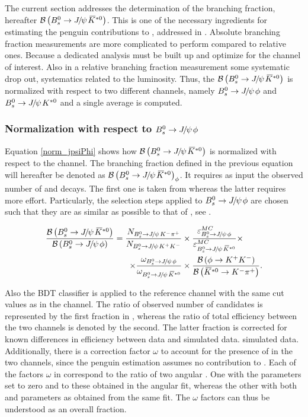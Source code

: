 
The current section addresses the determination of the \BsJpsiKst branching fraction, hereafter $\BRof\BsJpsiKst$.
This is one of the necessary ingredients for estimating the penguin contributions to \phis, addressed in .
Absolute branching fraction measurements are more complicated to perform compared to relative ones. Because a
dedicated analysis must be built up and optimize for the channel of interest. Also in a relative branching fraction
measurement some systematic drop out, \ie systematics related to the luminosity. Thus, the $\BRof\BsJpsiKst$ is
normalized with respect to two different channels, namely $\BsJpsiPhi$ and $\BdJpsiKst$ and a single average is computed.

\subsubsection{Normalization with respect to $\BsJpsiPhi$}
Equation \ref{norm_jpsiPhi} shows how $\BRof\BsJpsiKst$ is normalized with respect to the \BsJpsiPhi channel.
The branching fraction defined in the previous equation will hereafter be denoted as $\BRof{\BsJpsiKst}_\phi$.
It requires as input the observed number of \BsJpsiKst and \BsJpsiPhi decays. The first one is taken from
 whereas the latter requires more effort. Particularly, the selection steps applied
to $\BsJpsiPhi$ are chosen such that they are as similar as possible to that of \BsJpsiKst, see .

\begin{align}
  \centering
\frac{\BRof\BsJpsiKst}{\BRof\BsJpsiPhi} = \frac{N_{\BsJpsiKpi}}{N_{\BsJpsiKK}}
                                  &\times \frac{\varepsilon_{\BsJpsiPhi}^{MC}}{\varepsilon_{\BsJpsiKst}^{MC}}
                                   \times \nonumber \\
                                  \times \frac{\omega_{\BsJpsiPhi}}{\omega_{\BsJpsiKst}}
                                  & \times \frac{\BRof{\phi\to\kaon^+\kaon^-}}{\BRof{\Kstarzb\to\kaon^-\pion^+}}.
\label{norm_jpsiPhi}
\end{align}

\noindent Also the BDT classifier is applied to the reference channel
with the same cut values as in the \BsJpsiKst channel. The ratio of observed number of candidates is represented by the
first fraction in , whereas the ratio of total efficiency between the two channels is denoted
by the second. The latter fraction is corrected for known differences in efficiency between data and simulated data.
simulated data. Additionally, there is a correction factor $\omega$ to account for the presence of \swave in the two
channels, since the penguin estimation assumes no \swave contribution to \BsJpsiKst. Each of the factors $\omega$ in
 correspond to the ratio of two angular \pdfs. One with the \swave parameters set to zero and
\pwave to these obtained in the angular fit,  whereas the other with both \pwave and \swave parameters as obtained
from the same fit. The $\omega$ factors can thus be understood as an overall \swave fraction.

